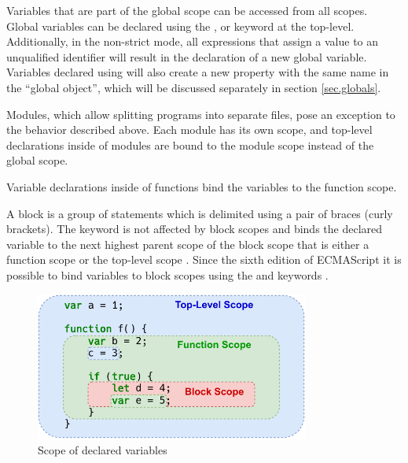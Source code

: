 \begin{description}[font=\sffamily\bfseries, leftmargin=1cm, style=nextline]
\item[Global]
    Variables that are part of the global scope can be accessed from all scopes. Global variables can be declared using the ,  or  keyword at the top-level. Additionally, in the non-strict mode, all expressions that assign a value to an unqualified identifier will result in the declaration of a new global variable. Variables declared using  will also create a new property with the same name in the “global object”, which will be discussed separately in section \ref{sec.globals}. \cite{MozVar}

\item[Module]
    Modules, which allow splitting programs into separate files, pose an exception to the behavior described above. Each module has its own scope, and top-level declarations inside of modules are bound to the module scope instead of the global scope. \cite{MozVar}

\item[Function]
    Variable declarations inside of functions bind the variables to the function scope. \cite{MozVar}

\item[Block]
    A block is a group of statements which is delimited using a pair of braces (curly brackets). The  keyword is not affected by block scopes and binds the declared variable to the next highest parent scope of the block scope that is either a function scope or the top-level scope \cite{MozVar}. Since the sixth edition of ECMAScript it is possible to bind variables to block scopes using the  and  keywords \cite{ECMA262_edition6}.
\end{description}

\begin{figure}[H]
    \centering
    \includegraphics[width=9cm]{img/scope-4spaces.pdf}
    \caption{Scope of declared variables}
    \label{fig.scope}
\end{figure}

